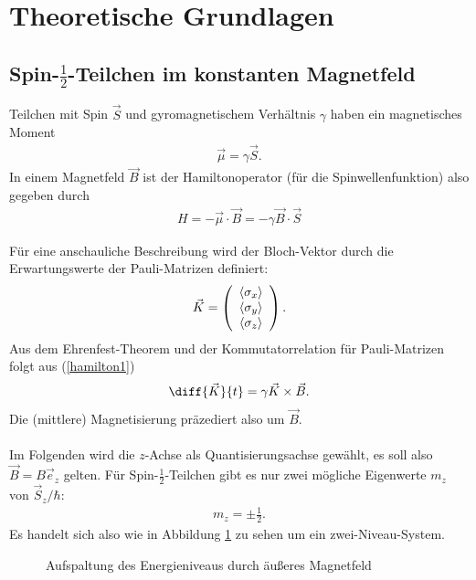 \section{Theoretische Grundlagen}

\subsection{Spin-$\frac{1}{2}$-Teilchen im konstanten Magnetfeld}
Teilchen mit Spin $\vec{S}$ und gyromagnetischem Verhältnis $\gamma$ haben ein magnetisches Moment
\begin{align*}
  \vec{\mu}=\gamma\vec{S}.
\end{align*}
In einem Magnetfeld $\vec{B}$ ist der Hamiltonoperator (für die Spinwellenfunktion) also gegeben durch
\begin{align}
  H=-\vec{\mu} \cdot \vec{B}=-\gamma \vec{B} \cdot \vec{S} \label{hamilton1}
\end{align}

Für eine anschauliche Beschreibung wird der Bloch-Vektor durch die Erwartungswerte der Pauli-Matrizen definiert:
\begin{align*}
  \vec{K}= \left( \begin{array}{c}
                    \braket{\sigma_x} \\
                    \braket{\sigma_y}\\
                    \braket{\sigma_z}
                  \end{array} \right).
\end{align*}
Aus dem Ehrenfest-Theorem und der Kommutatorrelation für Pauli-Matrizen folgt aus (\ref{hamilton1})
\begin{align}
  \diff{\vec{K}}{t}=\gamma \vec{K} \times \vec{B}.
\end{align}
Die (mittlere) Magnetisierung präzediert also um $\vec{B}.$ \\ \\

Im Folgenden wird die $z$-Achse als Quantisierungsachse gewählt, es soll also $\vec{B}=B\vec{e}_z$ gelten. Für Spin-$\frac{1}{2}$-Teilchen gibt es nur zwei mögliche Eigenwerte $m_z$ von $\vec{S}_z/\hbar$:
\begin{align*}
  m_z=\pm \frac{1}{2}.
\end{align*}
Es handelt sich also wie in Abbildung \ref{aufspaltung} zu sehen um ein zwei-Niveau-System.

\begin{figure}[h]
  \centering
  \caption{Aufspaltung des Energieniveaus durch äußeres Magnetfeld}
  \label{aufspaltung}
\end{figure}

